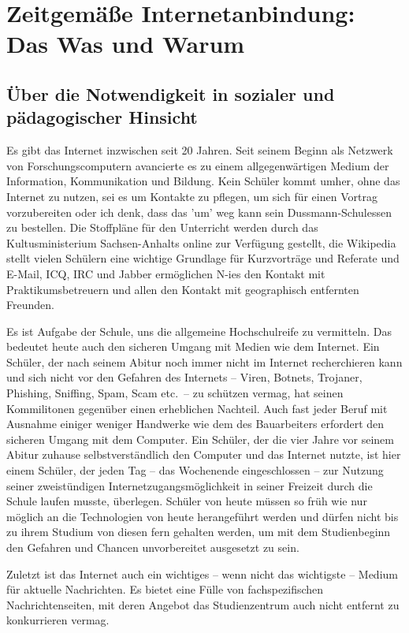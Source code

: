 \documentclass[10pt,a4paper,notitlepage]{scrartcl}
\newcommand{\robert}[1]{\textcolor{d-green}{#1}}
\begin{document}
\setlength{\columnsep}{1cm}
\section{Zeitgemäße Internetanbindung: Das Was und Warum}
\subsection{Über die Notwendigkeit in sozialer und pädagogischer Hinsicht}
\begin{multicols}{2}
Es gibt das Internet inzwischen seit 20 Jahren. Seit seinem Beginn als Netzwerk von Forschungscomputern avancierte es zu einem allgegenwärtigen Medium der Information, Kommunikation und Bildung. Kein Schüler kommt umher, ohne das Internet zu nutzen, sei es um Kontakte zu pflegen, um sich für einen Vortrag vorzubereiten oder \robert{ ich denk, dass das 'um'  weg kann} sein Dussmann-Schulessen zu bestellen. Die Stoffpläne für den Unterricht werden durch das Kultusministerium Sachsen-Anhalts online zur Verfügung gestellt, die Wikipedia stellt vielen Schülern eine wichtige Grundlage für Kurzvorträge und Referate und E-Mail, ICQ, IRC und Jabber ermöglichen N-ies den Kontakt mit Praktikumsbetreuern und allen den Kontakt mit geographisch entfernten Freunden.

Es ist Aufgabe der Schule, uns die allgemeine Hochschulreife zu vermitteln. Das bedeutet heute auch den sicheren Umgang mit Medien wie dem Internet. Ein Schüler, der nach seinem Abitur noch immer nicht im Internet recherchieren kann und sich nicht vor den Gefahren des Internets -- Viren, Botnets, Trojaner, Phishing, Sniffing, Spam, Scam etc.\ -- zu schützen vermag, hat seinen Kommilitonen gegenüber einen erheblichen Nachteil. Auch fast jeder Beruf mit Ausnahme einiger weniger Handwerke wie dem des Bauarbeiters erfordert den sicheren Umgang mit dem Computer. Ein Schüler, der die vier Jahre vor seinem Abitur zuhause selbstverständlich den Computer und das Internet nutzte, ist hier einem Schüler, der jeden Tag -- das Wochenende eingeschlossen -- zur Nutzung seiner zweistündigen Internetzugangsmöglichkeit in seiner Freizeit durch die Schule laufen musste,  überlegen. Schüler von heute müssen so früh wie nur möglich an die Technologien von heute herangeführt werden und dürfen nicht bis zu ihrem Studium von diesen fern gehalten werden, um mit dem Studienbeginn den Gefahren und Chancen unvorbereitet ausgesetzt zu sein.

Zuletzt ist das Internet auch ein wichtiges -- wenn nicht das wichtigste -- Medium für aktuelle Nachrichten. Es bietet eine Fülle von fachspezifischen Nachrichtenseiten, mit deren Angebot das Studienzentrum auch nicht entfernt zu konkurrieren vermag.
\end{multicols}
\end{document}
